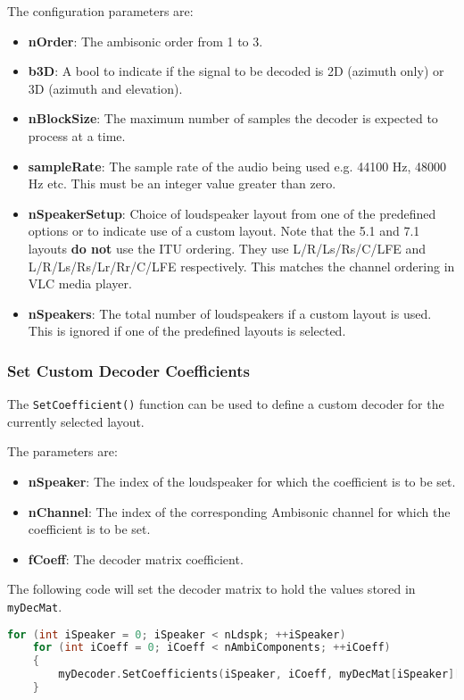 \documentclass[12pt]{report}
\newcommand{\code}[1]{\texttt{#1}}
\begin{document}
The configuration parameters are:
\begin{itemize}
    \item \textbf{nOrder}: The ambisonic order from 1 to 3.
    \item \textbf{b3D}: A bool to indicate if the signal to be decoded is 2D (azimuth only) or 3D (azimuth and elevation).
    \item \textbf{nBlockSize}: The maximum number of samples the decoder is expected to process at a time.
    \item \textbf{sampleRate}: The sample rate of the audio being used e.g. 44100 Hz, 48000 Hz etc. This must be an integer value greater than zero.
    \item \textbf{nSpeakerSetup}: Choice of loudspeaker layout from one of the predefined options or to indicate use of a custom layout. Note that the 5.1 and 7.1 layouts \textbf{do not} use the ITU ordering. They use L/R/Ls/Rs/C/LFE and L/R/Ls/Rs/Lr/Rr/C/LFE respectively. This matches the channel ordering in VLC media player.
    \item \textbf{nSpeakers}: The total number of loudspeakers if a custom layout is used. This is ignored if one of the predefined layouts is selected.
\end{itemize}

\subsubsection{Set Custom Decoder Coefficients}

The \code{SetCoefficient()} function can be used to define a custom decoder for the currently selected layout.

The parameters are:
\begin{itemize}
    \item \textbf{nSpeaker}: The index of the loudspeaker for which the coefficient is to be set.
    \item \textbf{nChannel}: The index of the corresponding Ambisonic channel for which the coefficient is to be set.
    \item \textbf{fCoeff}: The decoder matrix coefficient.
\end{itemize}

The following code will set the decoder matrix to hold the values stored in \code{myDecMat}.

\begin{lstlisting}[language=C++]
for (int iSpeaker = 0; iSpeaker < nLdspk; ++iSpeaker)
    for (int iCoeff = 0; iCoeff < nAmbiComponents; ++iCoeff)
    {
        myDecoder.SetCoefficients(iSpeaker, iCoeff, myDecMat[iSpeaker][iCoeff]);
    }
\end{lstlisting}
\end{document}
